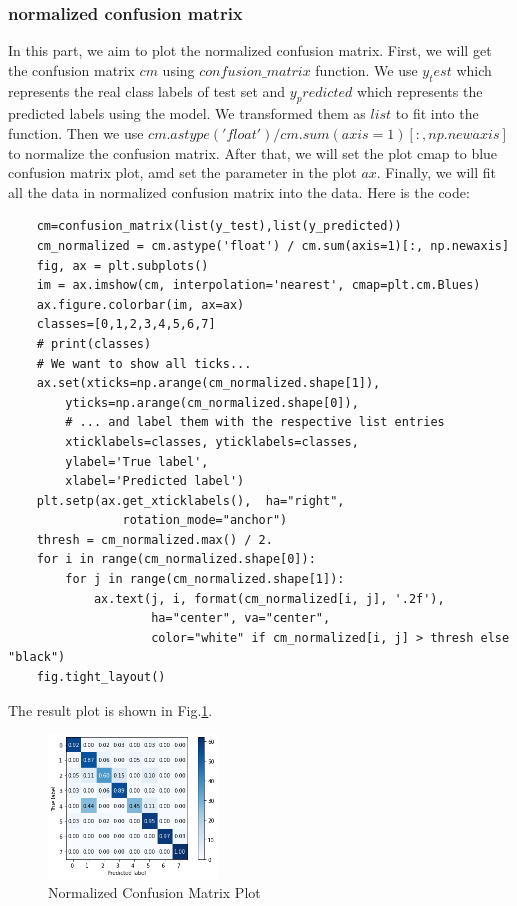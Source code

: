 \documentclass[conference]{IEEEtran}
\begin{document}
\subsubsection{normalized confusion matrix}
In this part, we aim to plot the normalized confusion matrix.
First, we will get the confusion matrix $cm$ using $confusion\_matrix$ function.
We use $y_test$ which represents the real class labels of test set and $y_predicted$ which represents the predicted labels using the model.
We transformed them as $list$ to fit into the function.
Then we use $cm.astype('float') / cm.sum(axis=1)[:, np.newaxis]$ to normalize the confusion matrix.
After that, we will set the plot cmap to blue confusion matrix plot, amd set the parameter in the plot $ax$.
Finally, we will fit all the data in normalized confusion matrix into the data.
Here is the code:
\begin{lstlisting}
    cm=confusion_matrix(list(y_test),list(y_predicted))
    cm_normalized = cm.astype('float') / cm.sum(axis=1)[:, np.newaxis]
    fig, ax = plt.subplots()
    im = ax.imshow(cm, interpolation='nearest', cmap=plt.cm.Blues)
    ax.figure.colorbar(im, ax=ax)
    classes=[0,1,2,3,4,5,6,7]
    # print(classes)
    # We want to show all ticks...
    ax.set(xticks=np.arange(cm_normalized.shape[1]),
        yticks=np.arange(cm_normalized.shape[0]),
        # ... and label them with the respective list entries
        xticklabels=classes, yticklabels=classes,
        ylabel='True label',
        xlabel='Predicted label')
    plt.setp(ax.get_xticklabels(),  ha="right",
                rotation_mode="anchor")
    thresh = cm_normalized.max() / 2.
    for i in range(cm_normalized.shape[0]):
        for j in range(cm_normalized.shape[1]):
            ax.text(j, i, format(cm_normalized[i, j], '.2f'),
                    ha="center", va="center",
                    color="white" if cm_normalized[i, j] > thresh else "black")
    fig.tight_layout()
\end{lstlisting}
The result plot is shown in Fig.\ref{Fig.t3q1c}.
\begin{figure}[h] 
    \centering
    \includegraphics[width=0.4\textwidth]{./graphs/T3Q1c.png}
    \caption{Normalized Confusion Matrix Plot} 
    \label{Fig.t3q1c} 
\end{figure}
\end{document}
